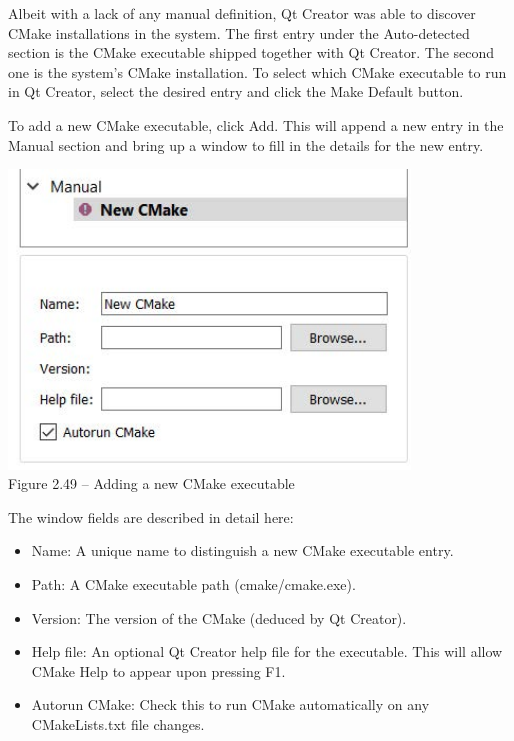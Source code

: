 Albeit with a lack of any manual definition, Qt Creator was able to discover CMake installations in the system. The first entry under the Auto-detected section is the CMake executable shipped together with Qt Creator. The second one is the system's CMake installation. To select which CMake executable to run in Qt Creator, select the desired entry and click the Make Default button.

To add a new CMake executable, click Add. This will append a new entry in the Manual section and bring up a window to fill in the details for the new entry.

\begin{center}
\includegraphics[width=0.8\textwidth]{content/1/chapter2/images/49.jpg}\\
Figure 2.49 – Adding a new CMake executable
\end{center}

The window fields are described in detail here:

\begin{itemize}
\item 
Name: A unique name to distinguish a new CMake executable entry.

\item 
Path: A CMake executable path (cmake/cmake.exe).

\item 
Version: The version of the CMake (deduced by Qt Creator).

\item 
Help file: An optional Qt Creator help file for the executable. This will allow CMake Help to appear upon pressing F1.

\item 
Autorun CMake: Check this to run CMake automatically on any CMakeLists.txt file changes.
\end{itemize}

